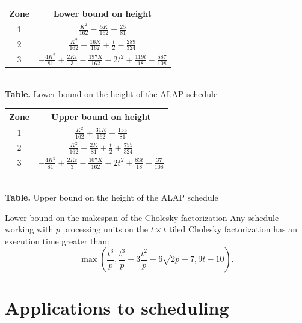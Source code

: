 \begin{frame}


\begin{tabular}{|c|c|}
  \hline
  Zone & Lower bound on height \\
  \hline
  1  & $\frac{K^{2}}{162}-\frac{5K}{162}-\frac{25}{81}$\\
  \hline
  2  & $\frac{K^{2}}{162}-\frac{16K}{162}+\frac{t}{2}-\frac{289}{324}$\\
  \hline
  3  & $-\frac{4K^{2}}{81}+\frac{2Kt}{3}-\frac{197K}{162}-2t^{2}+\frac{119t}{18}-\frac{587}{108}$ \\
  \hline
\end{tabular}\\
{\bf Table.} Lower bound on the height of the ALAP schedule\\

\vspace*{1cm}
\noindent
\begin{tabular}{|c|c|}
  \hline
  Zone & Upper bound on height \\
  \hline
  1  & $\frac{K^{2}}{162}+\frac{31K}{162}+\frac{155}{81}$\\
  \hline
  2  & $\frac{K^{2}}{162}+\frac{2K}{81}+\frac{t}{2}+\frac{755}{324} $\\
  \hline
  3  & $-\frac{4K^{2}}{81}+\frac{2Kt}{3}-\frac{107K}{162}-2t^{2}+\frac{83t}{18}+\frac{37}{108}$ \\
  \hline
\end{tabular}\\
{\bf Table.} 
Upper bound on the height of the ALAP schedule



\end{frame}



\begin{frame}






\begin{block}{Lower bound on the makespan of the Cholesky factorization}
Any schedule working with $p$ processing units on the $t\times t$ tiled Cholesky factorization has an execution time greater than:
$$\max( \frac{t^{3}}{p}, 
\frac{t^{3}}{p} - 3\frac{t^2}{p} + 6\sqrt{2p} - 7 ,
9t-10).$$
\end{block}




\end{frame}


\section{Applications to scheduling}



